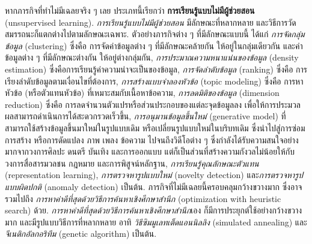 หากภารกิจที่ทำไม่มีเฉลยจริง ๆ เลย 
ประเภทนี้เรียกว่า \textbf{การเรียนรู้แบบไม่มีผู้ช่วยสอน} (unsupervised learning).
\textit{การเรียนรู้แบบไม่มีผู้ช่วยสอน}
มีลักษณะที่หลากหลาย และวิธีการวัดสมรรถนะก็แตกต่างไปตามลักษณะเฉพาะ.
ตัวอย่างภารกิจต่าง ๆ ที่มีลักษณะแบบนี้ ได้แก่
\textit{การจัดกลุ่มข้อมูล} (clustering) ซึ่งคือ การจัดค่าข้อมูลต่าง ๆ ที่มีลักษณะคล้ายกัน ให้อยู่ในกลุ่มเดียวกัน
และค่าข้อมูลต่าง ๆ ที่มีลักษณะต่างกัน ให้อยู่ต่างกลุ่มกัน,
\textit{การประมาณความหนาแน่นของข้อมูล} (density estimation)
ซึ่งคือการเรียนรู้ค่าความน่าจะเป็นของข้อมูล,
\textit{การจัดลำดับข้อมูล} (ranking) ซึ่งคือ การเรียงลำดับข้อมูลตามเงื่อนไขที่ต้องการ,
\textit{การสร้างแบบจำลองหัวข้อ} (topic modeling) ซึ่งคือ การหาหัวข้อ (หรือตัวแทนหัวข้อ) ที่เหมาะสมกับเนื้อหาข้อความ,
\textit{การลดมิติของข้อมูล} (dimension reduction) ซึ่งคือ การลดจำนวนตัวแปรหรือส่วนประกอบของแต่ละจุดข้อมูลลง 
เพื่อให้การประมวลผลสามารถดำเนินการได้สะดวกรวดเร็วขึ้น,
\textit{การอนุมานข้อมูลขึ้นใหม่} (generative model) 
ที่สามารถใช้สร้างข้อมูลขึ้นมาใหม่ในรูปแบบเดิม หรือเปลี่ยนรูปแบบใหม่ในบริบทเดิม ซึ่งนำไปสู่การซ่อม การสร้าง หรือการดัดแปลง ภาพ เพลง ข้อความ ไปจนถึงวิดีโอต่าง ๆ ซึ่งกำลังได้รับความสนใจอย่างมากจากวงการศิลปะ ดนตรี บันเทิง และการออกแบบ แต่ก็เป็นส่วนที่สร้างความกังวลไม่น้อยให้กับวงการสื่อสารมวลชน กฎหมาย และการพิสูจน์หลักฐาน,
\textit{การเรียนรู้คุณลักษณะตัวแทน} (representation learning\cite{BengioEtAL2014a}),
\textit{การตรวจหารูปแบบใหม่} (novelty detection\cite{PimentelEtAl2014a})
และ\textit{การตรวจหารูปแบบผิดปกติ} (anomaly detection\cite{AnomalyDetectionSurvey2009}) เป็นต้น.
ภารกิจที่ไม่มีเฉลยนี้ครอบคลุมกว้างขวางมาก ซึ่งอาจรวมไปถึง
\textit{การหาค่าดีที่สุดด้วยวิธีการค้นหาเชิงศึกษาสำนึก} (optimization with heuristic search) ด้วย.
\textit{การหาค่าดีที่สุดด้วยวิธีการค้นหาเชิงศึกษาสำนึก}เอง ก็มีการประยุกต์ใช้อย่างกว้างขวางมาก 
และมีรูปแบบวิธีการที่หลากหลาย อาทิ
\textit{วิธีซิมมูเลทเต็ดแอนนิลลิง} (simulated annealing\cite{KirkpatrickEtAl1983a})
และ
\textit{จีเนติกอัลกอริทึม} (genetic algorithm\cite{Whitley1994}) เป็นต้น.

